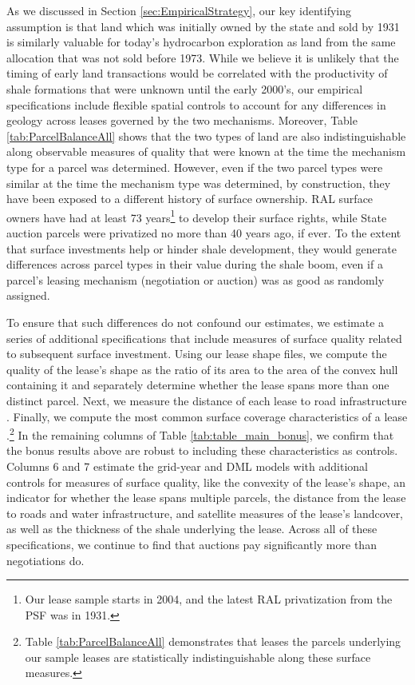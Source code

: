 As we discussed in Section \ref{sec:EmpiricalStrategy}, our key identifying assumption is that land which was initially owned by the state and sold by 1931 is similarly valuable for today's hydrocarbon exploration as land from the same allocation that was not sold before 1973. While we believe it is unlikely that the timing of early land transactions would be correlated with the productivity of shale formations that were unknown until the early 2000's, our empirical specifications include flexible spatial controls to account for any differences in geology across leases governed by the two mechanisms.  Moreover, Table \ref{tab:ParcelBalanceAll} shows that the two types of land are also indistinguishable along observable measures of quality that were known at the time the mechanism type for a parcel was determined.  However, even if the two parcel types were similar at the time the mechanism type was determined, by construction, they have been exposed to a different history of surface ownership.  RAL surface owners have had at least 73 years\footnote{Our lease sample starts in 2004, and the latest RAL privatization from the PSF was in 1931.} to develop their surface rights, while State auction parcels were privatized no more than 40 years ago, if ever. To the extent that surface investments help or hinder shale development, they would generate differences across parcel types in their value during the shale boom, even if a parcel's leasing mechanism (negotiation or auction) was as good as randomly assigned. 

To ensure that such differences do not confound our estimates, we estimate a series of additional specifications that include measures of surface quality related to subsequent surface investment.  Using our lease shape files, we compute the quality of the lease's shape as the ratio of its area to the area of the convex hull containing it and separately determine whether the lease spans more than one distinct parcel.  Next, we measure the distance of each lease to road infrastructure \citep{txdot}.  Finally, we compute the most common surface coverage characteristics of a lease \citep{nlcd}.\footnote{Table \ref{tab:ParcelBalanceAll} demonstrates that leases the parcels underlying our sample leases are statistically indistinguishable along these surface measures.}  In the remaining columns of Table \ref{tab:table_main_bonus}, we confirm that the bonus results above are robust to including these characteristics as controls. Columns 6 and 7 estimate the grid-year and DML models with additional controls for measures of surface quality, like the convexity of the lease's shape, an indicator for whether the lease spans multiple parcels, the distance from the lease to roads and water infrastructure, and satellite measures of the lease's landcover, as well as the thickness of the shale underlying the lease. Across all of these specifications, we continue to find that auctions pay significantly more than negotiations do.

